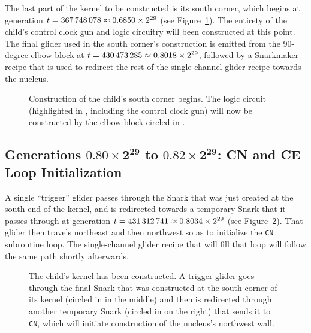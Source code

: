 The last part of the kernel to be constructed is its south corner, which begins at generation $t = 367{\,}748{\,}078 \approx 0.6850 \times 2^{29}$ (see Figure~\ref{fig:0e0p_timeline_367748078}). The entirety of the child's control clock gun and logic circuitry will been constructed at this point. The final glider used in the south corner's construction is emitted from the 90-degree elbow block at $t = 430{\,}473{\,}285 \approx 0.8018 \times 2^{29}$, followed by a Snarkmaker recipe that is used to redirect the rest of the single-channel glider recipe towards the nucleus.

\begin{figure}[!htb]
	\centering
	\caption{Construction of the child's south corner begins. The logic circuit (highlighted in , including the control clock gun) will now be constructed by the elbow block circled in .}
	\label{fig:0e0p_timeline_367748078}
\end{figure}


\subsection{Generations $\mathbf{0.80 \times 2^{29}}$ to $\mathbf{0.82 \times 2^{29}}$: CN and CE Loop Initialization}\label{sec:0e0p_timeline_nucleus_nw}

A single ``trigger'' glider passes through the Snark that was just created at the south end of the kernel, and is redirected towards a temporary Snark that it passes through at generation $t = 431{\,}312{\,}741 \approx 0.8034 \times 2^{29}$ (see Figure~\ref{fig:0e0p_timeline_431312741}). That glider then travels northeast and then northwest so as to initialize the \texttt{CN} subroutine loop. The single-channel glider recipe that will fill that loop will follow the same path shortly afterwards.

\begin{figure}[!htb]
	\centering
	\caption{The child's kernel has been constructed. A trigger glider goes through the final Snark that was constructed at the south corner of its kernel (circled in  in the middle) and then is redirected through another temporary Snark (circled in  on the right) that sends it to \texttt{CN}, which will initiate construction of the nucleus's northwest wall.}
	\label{fig:0e0p_timeline_431312741}
\end{figure}

